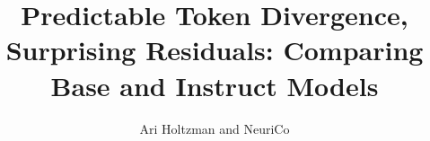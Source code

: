 \documentclass{article}
\title{Predictable Token Divergence, Surprising Residuals: Comparing Base and Instruct Models}
\author{Ari Holtzman and NeuriCo}
\begin{document}
\maketitle

\begin{abstract}

\end{abstract}










\end{document}
